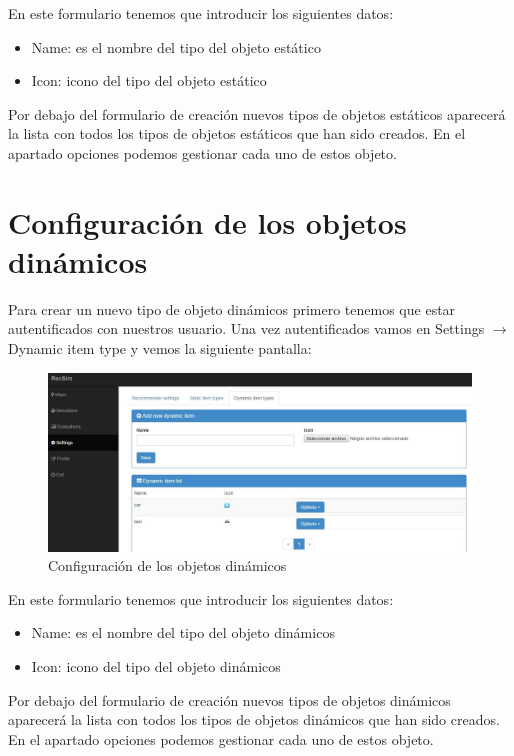 En este formulario tenemos que introducir los siguientes datos:

\begin{itemize}
	\item Name: es el nombre del tipo del objeto estático
	\item Icon: icono del tipo del objeto estático
\end{itemize}	

Por debajo del formulario de creación nuevos tipos de objetos estáticos aparecerá la lista con todos los tipos de objetos estáticos que han sido creados. En el apartado opciones podemos gestionar cada uno de estos objeto.

\section{Configuración de los objetos dinámicos}\label{sec:confObjDinamicos}

Para crear un nuevo tipo de objeto dinámicos primero tenemos que estar autentificados con nuestros usuario. Una vez autentificados vamos en Settings $\rightarrow$ Dynamic item type y vemos la siguiente pantalla:

\begin{figure}[H]
	\centering\includegraphics[scale=0.35]{imagenes/capitulo4/config-objetos-dinamicos.jpg}
	\caption{Configuración de los objetos dinámicos}
	\label{img:ConfiguracionObjetosDinamicos}
\end{figure}

En este formulario tenemos que introducir los siguientes datos:

\begin{itemize}
	\item Name: es el nombre del tipo del objeto dinámicos
	\item Icon: icono del tipo del objeto dinámicos
\end{itemize}

Por debajo del formulario de creación nuevos tipos de objetos dinámicos aparecerá la lista con todos los tipos de objetos dinámicos que han sido creados. En el apartado opciones podemos gestionar cada uno de estos objeto.


